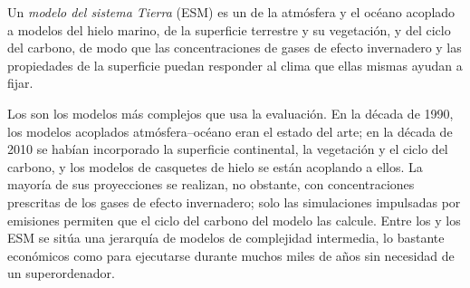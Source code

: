 \begin{omfigure}
\par{}\label{fig:b3:climate-models:grid}
\end{omfigure}

\begin{definition}\label{def:b3:climate-models:esm}
Un \emph{modelo del sistema Tierra} (ESM) es un 
de la atmósfera y el océano acoplado a modelos del
hielo marino, de la superficie terrestre y su vegetación, y del ciclo del carbono, de modo que
las concentraciones de gases de efecto invernadero y las propiedades de la
superficie puedan responder al clima que ellas mismas ayudan a fijar.
\end{definition}

Los  son los modelos más complejos que usa la evaluación. En
la década de 1990, los modelos acoplados atmósfera--océano eran el estado del arte;
en la década de 2010 se habían incorporado la superficie continental, la vegetación y el ciclo del carbono, y
los modelos de casquetes de hielo se están acoplando a ellos. La mayoría de sus proyecciones se
realizan, no obstante, con concentraciones prescritas de los gases de efecto invernadero;
solo las simulaciones impulsadas por emisiones permiten que el ciclo del carbono del modelo las calcule.
Entre los  y los ESM se sitúa una jerarquía de modelos
de complejidad intermedia, lo bastante económicos como para ejecutarse durante muchos miles de
años sin necesidad de un superordenador.

